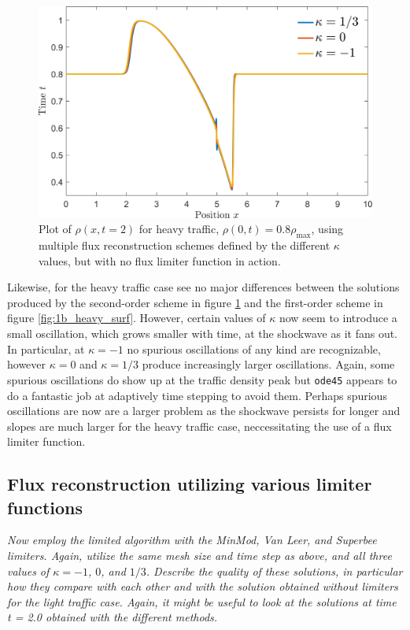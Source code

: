 \documentclass[11pt]{article}
\begin{document}
\begin{figure}[h!]
  \centering
  \includegraphics[width=\textwidth]{2a_heavy.png}
  \caption{Plot of $\rho(x,t=2)$ for heavy traffic, $\rho(0,t) = 0.8\rho_\mathrm{max}$, using multiple flux reconstruction schemes defined by the different $\kappa$ values, but with no flux limiter function in action.}
  \label{fig:2a_heavy}
\end{figure}

Likewise, for the heavy traffic case see no major differences between the solutions produced by the second-order scheme in figure \ref{fig:2a_heavy} and the first-order scheme in figure \ref{fig:1b_heavy_surf}. However, certain values of $\kappa$ now seem to introduce a small oscillation, which grows smaller with time, at the shockwave as it fans out. In particular, at $\kappa = -1$ no spurious oscillations of any kind are recognizable, however $\kappa = 0$ and $\kappa = 1/3$ produce increasingly larger oscillations. Again, some spurious oscillations do show up at the traffic density peak but \texttt{ode45} appears to do a fantastic job at adaptively time stepping to avoid them. Perhaps spurious oscillations are now are a larger problem as the shockwave persists for longer and slopes are much larger for the heavy traffic case, neccessitating the use of a flux limiter function.

\subsection{Flux reconstruction utilizing various limiter functions}
\begin{tcolorbox}
  \textit{Now employ the limited algorithm with the MinMod, Van Leer, and Superbee limiters. Again, utilize the same mesh size and time step as above, and all three values of $\kappa = -1$, $0$, and $1/3$. Describe the quality of these solutions, in particular how they compare with each other and with the solution obtained without limiters for the light traffic case. Again, it might be useful to look at the solutions at time t = 2.0 obtained with the different methods.}
\end{tcolorbox}
\end{document}

